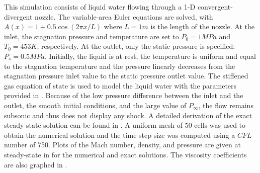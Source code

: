 This simulation consists of liquid water flowing through a 1-D convergent-divergent nozzle. The variable-area Euler equations are solved, with $A(x) = 1 + 0.5 \cos(2 \pi x / L)$ where $L=1m$ is the length of the nozzle. At the inlet, the stagnation pressure and temperature are set to $P_0 = 1 MPa$ and $T_0 = 453 K$, respectively. At the outlet, only the static pressure is specified: $P_s = 0.5MPa$. 
Initially, the liquid is at rest, the temperature is uniform and equal to the stagnation temperature and the pressure linearly decreases from the stagnation pressure inlet value to the static pressure outlet value. 
The stiffened gas equation of state is used to model the liquid water with the parameters provided in .
Because of the low pressure difference between the inlet and the outlet, the smooth initial conditions, and the large value of $P_\infty$, the flow remains subsonic and thus does not display any shock. A detailed derivation of the exact steady-state solution can be found in \cite{nozzle_exact}. A uniform mesh of $50$ cells was used to obtain the numerical solution and the time step size was computed using a $CFL$ number of 750.
Plots of the Mach number, density, and pressure are given at steady-state in  for the numerical and exact solutions. The viscosity coefficients are also graphed in . 
